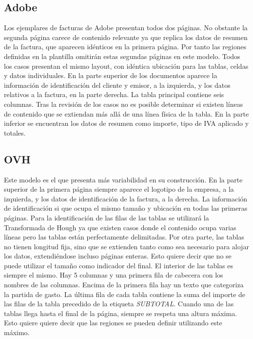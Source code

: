\subsection{Adobe}

Los ejemplares de facturas de Adobe presentan todos dos páginas. No obstante la segunda página carece de contenido relevante ya que replica los datos de resumen de la factura, que aparecen idénticos en la primera página. Por tanto las regiones definidas en la plantilla omitirán estas segundas páginas en este modelo.
Todos los casos presentan el mismo layout, con idéntica ubicación para las tablas, celdas y datos individuales. En la parte superior de los documentos aparece la información de identificación del cliente y emisor, a la izquierda, y los datos relativos a la factura, en la parte derecha.
La tabla principal contiene seis columnas. Tras la revisión de los casos no es posible determinar si existen líneas de contenido que se extiendan más allá de una línea física de la tabla.
En la parte inferior se encuentran los datos de resumen como importe, tipo de IVA aplicado y totales.

\subsection{OVH}

Este modelo es el que presenta más variabilidad en su construcción. En la parte superior de la primera página siempre aparece el logotipo de la empresa, a la izquierda, y los datos de identificación de la factura, a la derecha. La información de identificación si que ocupa el mismo tamaño y ubicación en todas las primeras páginas. Para la identificación de las filas de las tablas se utilizará la Transformada de Hough ya que existen casos donde el contenido ocupa varias líneas pero las tablas están perfectamente delimitadas. Por otra parte, las tablas no tienen longitud fija, sino que se extienden tanto como sea necesario para alojar los datos, extendiéndose incluso páginas enteras. Esto quiere decir que no se puede utilizar el tamaño como indicador del final. El interior de las tablas es siempre el mismo. Hay 5 columnas y una primera fila de cabecera con los nombres de las columnas. Encima de la primera fila hay un texto que categoriza la partida de gasto. La última fila de cada tabla contiene la suma del importe de las filas de la tabla precedido de la etiqueta \emph{SUBTOTAL}. Cuando una de las tablas llega hasta el final de la página, siempre se respeta una altura máxima. Esto quiere quiere decir que las regiones se pueden definir utilizando este máximo.

